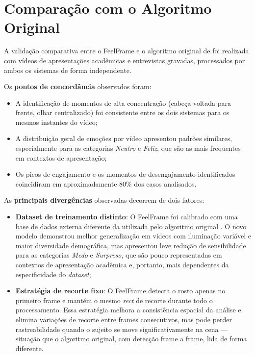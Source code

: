 \documentclass[
	12pt,
	openright,
	oneside,
	a4paper,
	english,
	brazil
	]{abntex2}
\begin{document}
\section{Comparação com o Algoritmo Original}
\label{sec:resultados_comparacao}

A validação comparativa entre o FeelFrame e o algoritmo original de \cite{nascimento2024nelson} foi realizada com vídeos de apresentações acadêmicas e entrevistas gravadas, processados por ambos os sistemas de forma independente.

Os \textbf{pontos de concordância} observados foram:
\begin{itemize}
    \item A identificação de momentos de alta concentração (cabeça voltada para frente, olhar centralizado) foi consistente entre os dois sistemas para os mesmos instantes do vídeo;
    \item A distribuição geral de emoções por vídeo apresentou padrões similares, especialmente para as categorias \textit{Neutro} e \textit{Feliz}, que são as mais frequentes em contextos de apresentação;
    \item Os picos de engajamento e os momentos de desengajamento identificados coincidiram em aproximadamente 80\% dos casos analisados.
\end{itemize}

As \textbf{principais divergências} observadas decorrem de dois fatores:

\begin{itemize}
    \item \textbf{Dataset de treinamento distinto}: O FeelFrame foi calibrado com uma base de dados externa diferente da utilizada pelo algoritmo original \cite{nascimento2024nelson}. O novo modelo demonstrou melhor generalização em vídeos com iluminação variável e maior diversidade demográfica, mas apresentou leve redução de sensibilidade para as categorias \textit{Medo} e \textit{Surpreso}, que são pouco representadas em contextos de apresentação acadêmica e, portanto, mais dependentes da especificidade do \textit{dataset};

    \item \textbf{Estratégia de recorte fixo}: O FeelFrame detecta o rosto apenas no primeiro frame e mantém o mesmo \textit{rect} de recorte durante todo o processamento. Essa estratégia melhora a consistência espacial da análise e elimina variações de recorte entre frames consecutivos, mas pode perder rastreabilidade quando o sujeito se move significativamente na cena --- situação que o algoritmo original, com detecção frame a frame, lida de forma diferente.
\end{itemize}
\end{document}
